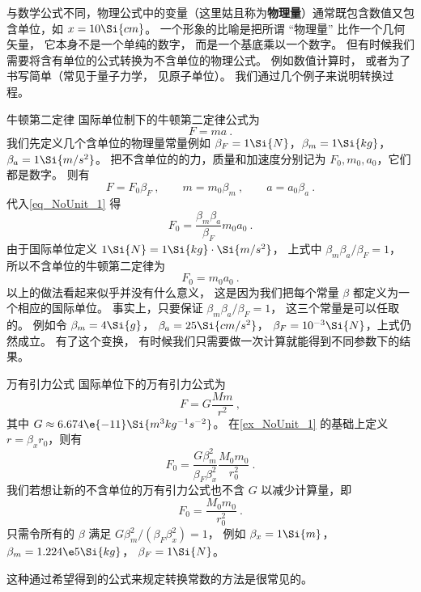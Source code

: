

与数学公式不同，物理公式中的变量（这里姑且称为\textbf{物理量}）通常既包含数值又包含单位，如 $x = 10\Si{cm}$。 一个形象的比喻是把所谓 “物理量” 比作一个几何矢量， 它本身不是一个单纯的数字， 而是一个基底乘以一个数字。 但有时候我们需要将含有单位的公式转换为不含单位的物理公式。 例如数值计算时， 或者为了书写简单（常见于量子力学， 见原子单位）。 我们通过几个例子来说明转换过程。

\begin{example}{牛顿第二定律}\label{ex_NoUnit_1}
国际单位制下的牛顿第二定律公式为
\begin{equation}\label{eq_NoUnit_1}
F = ma~.
\end{equation}
我们先定义几个含单位的物理量常量例如 $\beta_{F} = 1\Si{N}$，$\beta_{m} = 1\Si{kg}$，$\beta_{a} = 1\Si{m/s^2}$。 把不含单位的的力，质量和加速度分别记为 $F_0, m_0, a_0$，它们都是数字。 则有
\begin{equation}
F = F_0 \beta_F~, \qquad
m = m_0 \beta_{m}~, \qquad
a = a_0 \beta_{a}~.
\end{equation}
代入\autoref{eq_NoUnit_1} 得
\begin{equation}
F_0 = \frac{\beta_m \beta_a}{\beta_F} m_0  a_0~.
\end{equation}
由于国际单位定义 $1\Si{N} = 1\Si{kg}\cdot\Si{m/s^2}$， 上式中 $\beta_m \beta_a/\beta_F = 1$， 所以不含单位的牛顿第二定律为
\begin{equation}\label{eq_NoUnit_3}
F_0 = m_0 a_0~.
\end{equation}
以上的做法看起来似乎并没有什么意义， 这是因为我们把每个常量 $\beta$ 都定义为一个相应的国际单位。 事实上，只要保证 $\beta_m \beta_a/\beta_F = 1$， 这三个常量是可以任取的。 例如令 $\beta_m = 4\Si{g}$， $\beta_a = 25\Si{cm/s^2}$， $\beta_F = 10^{-3}\Si{N}$，上式仍然成立。 有了这个变换， 有时候我们只需要做一次计算就能得到不同参数下的结果。
\end{example}

\begin{example}{万有引力公式}\label{ex_NoUnit_2}
国际单位下的万有引力公式为
\begin{equation}
F = G\frac{Mm}{r^2}~,
\end{equation}
其中 $G \approx 6.674\e{-11} \Si{m^3 kg^{-1} s^{-2}}$。 在\autoref{ex_NoUnit_1} 的基础上定义 $r = \beta_x r_0$，则有
\begin{equation}
F_0 = \frac{G\beta_m^2}{\beta_F \beta_x^2} \frac{M_0 m_0}{r_0^2}~.
\end{equation}
我们若想让新的不含单位的万有引力公式也不含 $G$ 以减少计算量，即
\begin{equation}\label{eq_NoUnit_6}
F_0 = \frac{M_0 m_0}{r_0^2}~.
\end{equation}
只需令所有的 $\beta$ 满足 $G\beta_m^2/(\beta_F\beta_x^2) = 1$， 例如 $\beta_x = 1\Si{m}$， $\beta_m = 1.224\e5 \Si{kg}$， $\beta_F = 1\Si{N}$。
\end{example}
这种通过希望得到的公式来规定转换常数的方法是很常见的。


